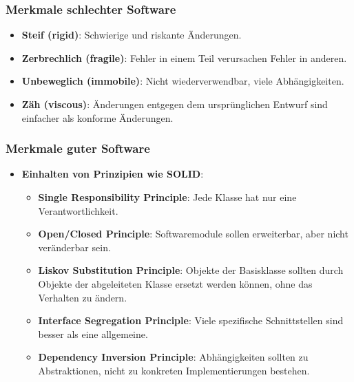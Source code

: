\documentclass[11pt, a4paper]{article}
\begin{document}
\subsubsection{Merkmale schlechter Software}
\begin{itemize}
    \item \textbf{Steif (rigid)}: Schwierige und riskante Änderungen.
    \item \textbf{Zerbrechlich (fragile)}: Fehler in einem Teil verursachen Fehler in anderen.
    \item \textbf{Unbeweglich (immobile)}: Nicht wiederverwendbar, viele Abhängigkeiten.
    \item \textbf{Zäh (viscous)}: Änderungen entgegen dem ursprünglichen Entwurf sind einfacher als konforme Änderungen.
\end{itemize}

\subsubsection{Merkmale guter Software}
\begin{itemize}
    \item \textbf{Einhalten von Prinzipien wie SOLID}:
    \begin{itemize}
        \item \textbf{Single Responsibility Principle}: Jede Klasse hat nur eine Verantwortlichkeit.
        \item \textbf{Open/Closed Principle}: Softwaremodule sollen erweiterbar, aber nicht veränderbar sein.
        \item \textbf{Liskov Substitution Principle}: Objekte der Basisklasse sollten durch Objekte der abgeleiteten Klasse ersetzt werden können, ohne das Verhalten zu ändern.
        \item \textbf{Interface Segregation Principle}: Viele spezifische Schnittstellen sind besser als eine allgemeine.
        \item \textbf{Dependency Inversion Principle}: Abhängigkeiten sollten zu Abstraktionen, nicht zu konkreten Implementierungen bestehen.
    \end{itemize}
\end{itemize}
\end{document}
